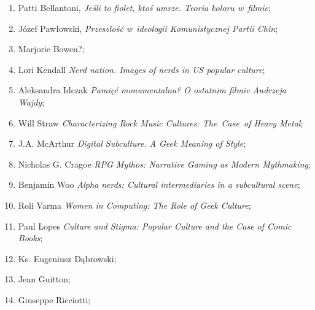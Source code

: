 \documentclass[a4paper,11pt]{article}
\begin{document}
\begin{enumerate}
\item Patti Bellantoni, \textit{Jeśli to fiolet, ktoś umrze. Teoria koloru
    w~filmie};



\item Józef Pawłowski, \textit{Przeszłość w~ideologii Komunistycznej Partii
    Chin};



\item Marjorie Bowen?;



\item Lori Kendall \textit{Nerd nation. Images of nerds in US popular
    culture};



\item Aleksandra Idczak \textit{Pamięć monumentalna? O ostatnim filmie
    Andrzeja Wajdy};



\item Will Straw \textit{Characterizing Rock Music Cultures: The~Case~of
  Heavy Metal};



\item J.A. McArthur \textit{Digital Subculture. A Geek Meaning of Style};



\item Nicholas G. Cragoe \textit{RPG Mythos: Narrative Gaming as
    Modern Mythmaking};



\item Benjamin Woo \textit{Alpha nerds: Cultural intermediaries in a
    subcultural scene};



\item Roli Varma \textit{Women in Computing: The Role of Geek Culture};



\item Paul Lopes \textit{Culture and Stigma: Popular Culture and the Case
    of Comic Books};



\item Ks. Eugeniusz Dąbrowski;



\item Jean Guitton;



\item Giuseppe Ricciotti;




\end{enumerate}
\end{document}
